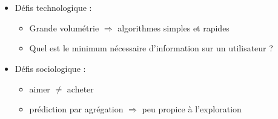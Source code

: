 \begin{frame}
  \frametitle{~}
  \begin{itemize}[<+->]
  \item Défis technologique :
    \begin{itemize}[<+->]
    \item Grande volumétrie $\Rightarrow$ algorithmes simples et rapides
    \item Quel est le minimum nécessaire d'information sur un utilisateur ?
    \end{itemize}
  \item Défis sociologique :
    \begin{itemize}[<+->]
    \item aimer $\neq$ acheter
    \item prédiction par agrégation $\Rightarrow$ peu propice à l'exploration
    \end{itemize}
  \end{itemize}
\end{frame}
